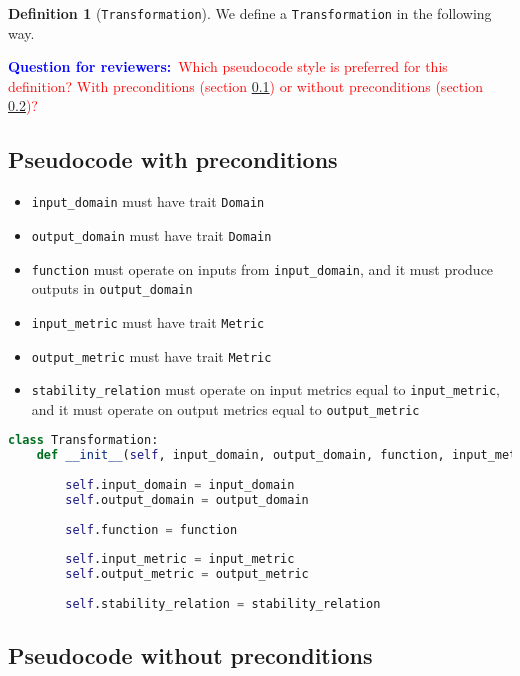\documentclass[11pt,a4paper]{article}
\theoremstyle{definition}
\newtheorem{definition}{Definition}[section]
\newcommand{\questionr}[1]{\textcolor{blue}{\textbf{Question for reviewers:}}\textcolor{red}{~#1}}
\begin{document}
\begin{definition}[\texttt{Transformation}]
    We define a \texttt{Transformation} in the following way.
    
    \questionr{Which pseudocode style is preferred for this definition? With preconditions (section \ref{sec:pseudocode-w-preconditions}) or without preconditions (section \ref{sec:pseudocode-wout-preconditions})?}
    
\subsection{Pseudocode with preconditions}
\label{sec:pseudocode-w-preconditions}

\begin{itemize}
    \item \texttt{input\_domain} must have trait \texttt{Domain}
    \item \texttt{output\_domain} must have trait \texttt{Domain}
    \item \texttt{function} must operate on inputs from \texttt{input\_domain}, and it must produce outputs in \texttt{output\_domain}
    \item \texttt{input\_metric} must have trait \texttt{Metric}
    \item \texttt{output\_metric} must have trait \texttt{Metric}
    \item \texttt{stability\_relation} must operate on input metrics equal to \texttt{input\_metric}, and it must operate on output metrics equal to \texttt{output\_metric}
\end{itemize}

\begin{lstlisting}[language=Python]
class Transformation:
    def __init__(self, input_domain, output_domain, function, input_metric, output_metric, stability_relation):
    	
        self.input_domain = input_domain
        self.output_domain = output_domain
        
        self.function = function
        
        self.input_metric = input_metric
        self.output_metric = output_metric
        
        self.stability_relation = stability_relation
\end{lstlisting}
    
\subsection{Pseudocode without preconditions}
\label{sec:pseudocode-wout-preconditions}


\end{definition}
\end{document}
